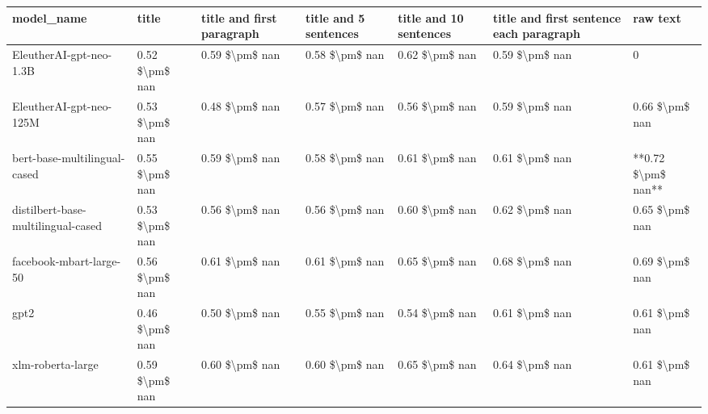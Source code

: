 \begin{tabular}{lllllll}
\toprule
                        model\_name &          title & title and first paragraph & title and 5 sentences & title and 10 sentences & title and first sentence each paragraph &           raw text \\
\midrule
           EleutherAI-gpt-neo-1.3B & 0.52 \$\textbackslash pm\$ nan &            0.59 \$\textbackslash pm\$ nan &        0.58 \$\textbackslash pm\$ nan &         0.62 \$\textbackslash pm\$ nan &                          0.59 \$\textbackslash pm\$ nan &                  0 \\
           EleutherAI-gpt-neo-125M & 0.53 \$\textbackslash pm\$ nan &            0.48 \$\textbackslash pm\$ nan &        0.57 \$\textbackslash pm\$ nan &         0.56 \$\textbackslash pm\$ nan &                          0.59 \$\textbackslash pm\$ nan &     0.66 \$\textbackslash pm\$ nan \\
      bert-base-multilingual-cased & 0.55 \$\textbackslash pm\$ nan &            0.59 \$\textbackslash pm\$ nan &        0.58 \$\textbackslash pm\$ nan &         0.61 \$\textbackslash pm\$ nan &                          0.61 \$\textbackslash pm\$ nan & **0.72 \$\textbackslash pm\$ nan** \\
distilbert-base-multilingual-cased & 0.53 \$\textbackslash pm\$ nan &            0.56 \$\textbackslash pm\$ nan &        0.56 \$\textbackslash pm\$ nan &         0.60 \$\textbackslash pm\$ nan &                          0.62 \$\textbackslash pm\$ nan &     0.65 \$\textbackslash pm\$ nan \\
           facebook-mbart-large-50 & 0.56 \$\textbackslash pm\$ nan &            0.61 \$\textbackslash pm\$ nan &        0.61 \$\textbackslash pm\$ nan &         0.65 \$\textbackslash pm\$ nan &                          0.68 \$\textbackslash pm\$ nan &     0.69 \$\textbackslash pm\$ nan \\
                              gpt2 & 0.46 \$\textbackslash pm\$ nan &            0.50 \$\textbackslash pm\$ nan &        0.55 \$\textbackslash pm\$ nan &         0.54 \$\textbackslash pm\$ nan &                          0.61 \$\textbackslash pm\$ nan &     0.61 \$\textbackslash pm\$ nan \\
                 xlm-roberta-large & 0.59 \$\textbackslash pm\$ nan &            0.60 \$\textbackslash pm\$ nan &        0.60 \$\textbackslash pm\$ nan &         0.65 \$\textbackslash pm\$ nan &                          0.64 \$\textbackslash pm\$ nan &     0.61 \$\textbackslash pm\$ nan \\
\bottomrule
\end{tabular}
